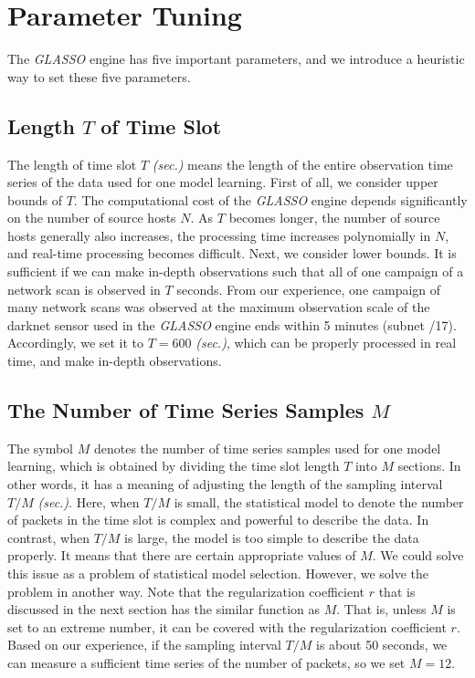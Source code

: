 \documentclass[conference]{IEEEtran}
\begin{document}
\section{Parameter Tuning}
\label{Parameter}
The \textit{GLASSO} engine has five important parameters, and we introduce a heuristic way to set these five parameters.


\subsection{Length $T$ of Time Slot}
The length of time slot $T$ \textit{(sec.)} means the length of the entire observation time series of the data used for one model learning.
First of all, we consider upper bounds of $T$.
The computational cost of the \textit{GLASSO} engine depends significantly on the number of source hosts $N$.
As $T$ becomes longer, the number of source hosts generally also increases, the processing time increases polynomially in $N$, and real-time processing becomes difficult.
Next, we consider lower bounds.
It is sufficient if we can make in-depth observations such that all of one campaign of a network scan is observed in $T$ seconds.
From our experience, one campaign of many network scans was observed at the maximum observation scale of the darknet sensor used in the \textit{GLASSO} engine ends within 5 minutes (subnet /17).
Accordingly, we set it to $T=600$ \textit{(sec.)}, which can be properly processed in real time, and make in-depth observations.



\subsection{The Number of Time Series Samples $M$}
The symbol $M$ denotes the number of time series samples used for one model learning, which is obtained by dividing the time slot length $T$ into $M$ sections.
In other words, it has a meaning of adjusting the length of the sampling interval $T/M$ \textit{(sec.)}.
Here, when $T/M$ is small, the statistical model to denote the number of packets in the time slot is complex and powerful to describe the data.
In contrast, when $T/M$ is large, the model is too simple to describe the data properly.
It means that there are certain appropriate values of $M$.
We could solve this issue as a problem of statistical model selection.
However, we solve the problem in another way.
Note that the regularization coefficient $r$ that is discussed in the next section has the similar function as $M$.
That is, unless $M$ is set to an extreme number, it can be covered with the regularization coefficient $r$.
Based on our experience, if the sampling interval $T/M$ is about 50 seconds, we can measure a sufficient time series of the number of packets, so we set $M=12$.
\end{document}
